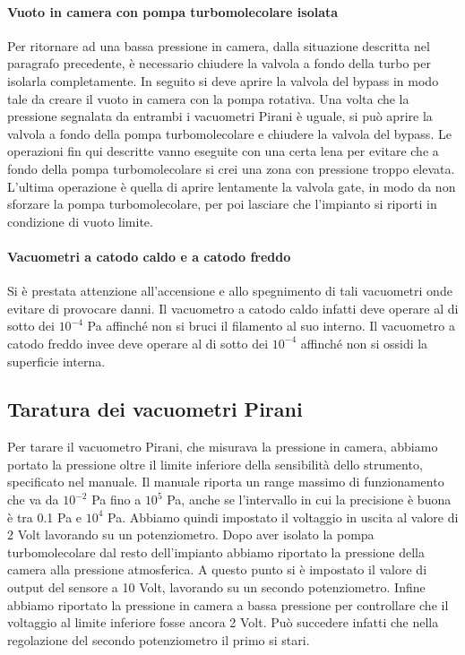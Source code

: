 \paragraph{Vuoto in camera con pompa turbomolecolare isolata\\} %
Per ritornare ad una bassa pressione in camera, dalla situazione descritta nel paragrafo precedente, è necessario chiudere la valvola a fondo della turbo per isolarla completamente. In seguito si deve aprire la valvola del bypass in modo tale da creare il vuoto in camera con la pompa rotativa. Una volta che la pressione segnalata da entrambi i vacuometri Pirani è uguale, si può aprire la valvola a fondo della pompa turbomolecolare e chiudere la valvola del bypass. Le operazioni fin qui descritte vanno eseguite con una certa lena per evitare che a fondo della pompa turbomolecolare si crei una zona con pressione troppo elevata. L'ultima operazione è quella di aprire lentamente la valvola gate, in modo da non sforzare la pompa turbomolecolare, per poi lasciare che l'impianto si riporti in condizione di vuoto limite. %
\paragraph{Vacuometri a catodo caldo e a catodo freddo\\}
Si è prestata attenzione all'accensione e allo spegnimento di tali vacuometri onde evitare di provocare danni. Il vacuometro a catodo caldo infatti deve operare al di sotto dei $10^{-4}$ \si{\pascal} affinché non si bruci il filamento al suo interno. Il vacuometro a catodo freddo invee deve operare al di sotto dei $10^{-4}$ affinché non si ossidi la superficie interna. %

\subsection{Taratura dei vacuometri Pirani}

Per tarare il vacuometro Pirani, che misurava la pressione in camera, abbiamo portato la pressione oltre il limite inferiore
della sensibilità dello strumento, specificato nel manuale. Il manuale riporta un range massimo di funzionamento che va da $10^{-2}$ \si{\pascal} fino a $10^5$ \si{\pascal}, anche se l'intervallo in cui la precisione è buona è tra 0.1 \si{\pascal} e $10^4$ \si{\pascal}. Abbiamo quindi impostato il voltaggio in uscita al valore di 2 Volt lavorando su un potenziometro. Dopo aver isolato la pompa turbomolecolare dal resto dell'impianto abbiamo riportato la pressione della camera alla pressione atmosferica. A questo punto si è impostato il valore di output del sensore a 10 Volt, lavorando su un secondo potenziometro. Infine abbiamo riportato la pressione in camera a bassa pressione per controllare che il voltaggio al limite inferiore fosse ancora 2 Volt. Può succedere infatti che nella regolazione del secondo potenziometro il primo si stari.

